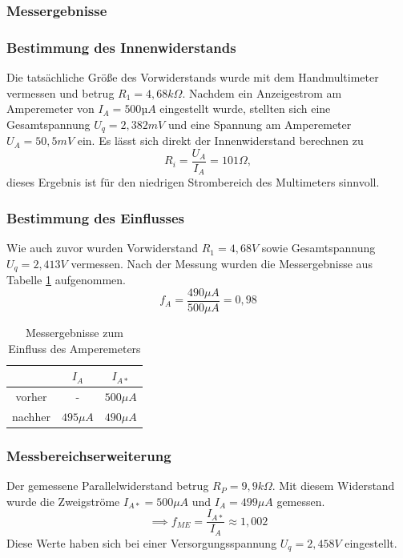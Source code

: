 \documentclass[a4paper]{article}
\begin{document}
\subsubsection{Messergebnisse}
\subsubsection*{Bestimmung des Innenwiderstands}
Die tatsächliche Größe des Vorwiderstands wurde mit dem Handmultimeter vermessen
und betrug $R_{1}=4,68\unit{k\Omega}$.
Nachdem ein Anzeigestrom am Amperemeter von $I_{A}=500\unit{µA}$ eingestellt wurde,
stellten sich eine Gesamtspannung $U_{q}=2,382\unit{mV}$ und eine Spannung am
Amperemeter $U_{A}=50,5 \unit{mV}$ ein.\newline
Es lässt sich direkt der Innenwiderstand berechnen zu
\[ R_{i}= \frac{U_{A}}{I_{A}}= 101\unit{\Omega} ,\]
dieses Ergebnis ist für den niedrigen Strombereich des Multimeters sinnvoll.

\subsubsection*{Bestimmung des Einflusses}
Wie auch zuvor wurden Vorwiderstand $R_{1}=4,68\unit{V}$ sowie
Gesamtspannung $U_{q}=2,413V$ vermessen. Nach der Messung wurden die
Messergebnisse aus Tabelle \ref{tab:2b_EinflussAM} aufgenommen.
\[ f_{A}=\frac{490\unit{\mu A}}{500\unit{\mu A}} =0,98\]
\begin{table}[h]
    \centering
    \caption{Messergebnisse zum Einfluss des Amperemeters}
    \label{tab:2b_EinflussAM}
    \begin{tabular}{|c|c|c|}
        \hline
     & $I_{A}$  & $I_{A*}$\\ 
     \hline
        vorher & - & $500\unit{\mu A}$ \\
        \hline
        nachher & $495\unit{\mu A}$ & $490\unit{\mu A}$\\
     \hline
    \end{tabular}
\end{table}

\subsubsection*{Messbereichserweiterung}
Der gemessene Parallelwiderstand betrug $R_{P}=9,9\unit{k\Omega}$.
Mit diesem Widerstand wurde die Zweigströme $I_{A*}=500\unit{\mu A}$ und
$I_{A}=499\unit{\mu A}$ gemessen.
\[ \implies f_{ME}=\frac{I_{A*}}{I_{A}}\approx 1,002 \]
Diese Werte haben sich bei einer Versorgungsspannung $U_{q}=2,458\unit{V}$ eingestellt.
\end{document}
